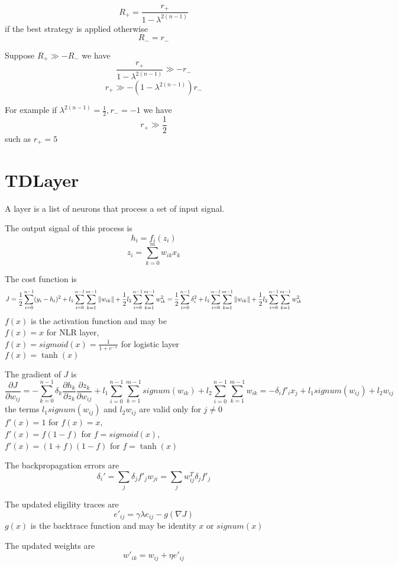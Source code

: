 \documentclass[a4paper,11pt]{article}
\begin{document}
\[ 
	R_+ = \frac{r_+}{1 - \lambda ^ {2 (n -1)}}
 \]
if the best strategy is applied otherwise 
\[ 
R_- = r_-
\]

Suppose $ R_+ \gg -R_- $ we have 
\[ 
	\frac{r_+}{1 - \lambda ^ {2 (n -1)}} \gg -r_-
\]
\[ 
	r_+ \gg -(1 - \lambda ^ {2 (n -1)}) r_-
\]

For example if $ \lambda ^ {2 (n -1)} = \frac{1}{2}, r_- = -1 $ we have 
\[ 
r_+ \gg \frac{1}{2}
\]
such as $ r_+ = 5 $


\section{TDLayer}

A layer is a list of neurons that process a set of input signal.

The output signal of this process is
\[
	h_i = f_i(z_i)
\]
\[
	z_i = \sum_{k=0}^{m} w_{ik} x_k
\]

The cost function is
\[
	J
	= \frac{1}{2} \sum_{i=0}^{n-1} (y_i - h_i)^2
		+ l_1 \sum_{i=0}^{n-1} \sum_{k=1}^{m-1} \Arrowvert w_{ik} \Arrowvert
		+ \frac{1}{2} l_2 \sum_{i=0}^{n-1} \sum_{k=1}^{m-1} w^2_{ik}
	= \frac{1}{2} \sum_{i=0}^{n-1} \delta_i^2
		+ l_1 \sum_{i=0}^{n-1} \sum_{k=1}^{m-1} \Arrowvert w_{ik} \Arrowvert
		+ \frac{1}{2} l_2 \sum_{i=0}^{n-1} \sum_{k=1}^{m-1} w^2_{ik}
\]
$ f(x) $ is the activation function and may be
\\
$ f(x) = x $ for NLR layer,
\\
$ f(x) = sigmoid(x) = \frac{1}{1+e^{-x}} $ for logistic layer
\\
$ f(x) = \tanh(x) $

The gradient of $ J $ is
\[
	\frac{\partial J}{\partial w_{ij}}
		= -\sum_{k=0}^{n-1} \delta_k \frac{\partial h_k}{\partial z_k} \frac{\partial z_k}{\partial w_{ij}}
			+ l_1 \sum_{i=0}^{n-1} \sum_{k=1}^{m-1} signum(w_{ik})
			+ l_2 \sum_{i=0}^{n-1} \sum_{k=1}^{m-1} w_{ik}
		= -\delta_i f'_i x_j 
			+ l_1 signum(w_{ij})
			+ l_2 w_{ij}
\]
the terms $ l_1 signum(w_{ij}) $ and $ l_2 w_{ij} $ are valid only for $ j \ne 0 $
\\
$ f'(x) = 1 $ for $ f(x) = x $,
\\
$ f'(x) = f (1 - f)  $ for $ f = sigmoid(x) $,
\\
$ f'(x) = (1 + f) (1 - f)  $ for $ f = \tanh(x) $

The backpropagation errors are
\[
	\delta_i'
		= \sum_{j} \delta_j f'_j w_{ji}
		= \sum_{j} w^T_{ij} \delta_j f'_j
\]

The updated eligility traces are
\[
	e'_{ij}
		= \gamma \lambda e_{ij} - g(\nabla J)
\]
$ g(x) $ is the backtrace function and may be identity $ x $ or $ signum(x) $

The updated weights are
\[
	w'_{ik}
		= w_{ij} + \eta e'_{ij}
\]
\end{document}
